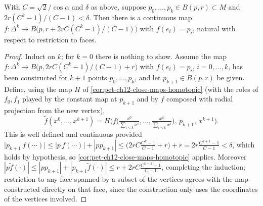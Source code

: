 \begin{lemma}
  \label{lem:pet-ch12-simplex-extension}
  With $C=\sqrt2/\cos\alpha$ and $\delta$ as above, suppose
  $p_0,\dots,p_k\in B(p,r)\subset M$ and $2r(C^k-1)/(C-1)<\delta$. Then there is
  a continuous map $f:\Delta^k\to B\big(p,r+2rC(C^k-1)/(C-1)\big)$ with
  $f(e_i)=p_i$, natural with respect to restriction to faces.
\end{lemma}
\begin{proof}
  Induct on $k$; for $k=0$ there is nothing to show. Assume the map
  $f:\Delta^k\to B\big(p,2rC(C^k-1)/(C-1)+r\big)$ with $f(e_i)=p_i$,
  $i=0,\dots,k$, has been constructed for $k+1$ points $p_0,\dots,p_k$, and let
  $p_{k+1}\in B(p,r)$ be given. Define, using the map $H$ of
  \cref{cor:pet-ch12-close-maps-homotopic} (with the roles of $f_0,f_1$ played
  by the constant map at $p_{k+1}$ and by $f$ composed with radial projection
  from the new vertex),
  \[
    \tilde f(x^0,\dots,x^{k+1})=H\Big(f\Big(\tfrac{x^0}{\sum_{i\le k}x^i},\dots,\tfrac{x^k}{\sum_{i\le k}x^i}\Big),\,p_{k+1},\,x^{k+1}\Big).
  \]
  This is well defined and continuous provided
  $\big|p_{k+1}\,f(\cdots)\big|\le\big|p\,f(\cdots)\big|+|pp_{k+1}|\le
  \big(2rC\tfrac{C^k-1}{C-1}+r\big)+r=2r\tfrac{C^{k+1}-1}{C-1}<\delta$, which
  holds by hypothesis, so \cref{cor:pet-ch12-close-maps-homotopic} applies.
  Moreover $|p\tilde f(\cdot)|\le|pp_{k+1}|+|p_{k+1}\tilde f(\cdot)|\le
  r+2rC\tfrac{C^{k+1}-1}{C-1}$, completing the induction; restriction to any
  face spanned by a subset of the vertices agrees with the map constructed
  directly on that face, since the construction only uses the coordinates of
  the vertices involved.
\end{proof}

